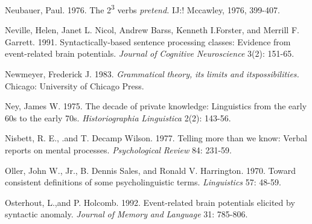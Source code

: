 \begin{styleStandard}
Neubauer, Paul. 1976. The 2\textsuperscript{3}\textsuperscript{ }verbs \textit{pretend.}\textit{ }IJ:! Mccawley, 1976, 399-407.
\end{styleStandard}


\begin{styleStandard}
Neville, Helen, Janet L. Nicol, Andrew Barss, Kenneth I.Forster, and Merrill F. Garrett. 1991. Syntactically-based sentence processing classes: Evidence from event-related brain potentials. \textit{Journal}\textit{ }\textit{of}\textit{ }\textit{Cognitive}\textit{ }\textit{Neuroscience}\textit{ }3(2): 151-65.
\end{styleStandard}


\begin{styleStandard}
Newmeyer, Frederick J. 1983. \textit{Grammatical}\textit{ }\textit{theory,}\textit{ }\textit{its}\textit{ }\textit{limits}\textit{ }\textit{and}\textit{ }\textit{itspossibilities.}\textit{ }Chicago: University of Chicago Press.
\end{styleStandard}


\begin{styleStandard}
Ney, James W. 1975. The decade of private knowledge: Linguistics from the early 60{\textquotesingle}s to the early 70{\textquotesingle}s. \textit{Historiographia}\textit{ }\textit{Linguistica}\textit{ }2(2): 143-56.
\end{styleStandard}


\begin{styleStandard}
Nisbett, R. E., .and T. Decamp Wilson. 1977. Telling more than we know: Verbal reports on mental processes. \textit{Psychological}\textit{ }\textit{Review}\textit{ }84: 231-59.
\end{styleStandard}


\begin{styleStandard}
Oller, John W., Jr., B. Dennis Sales, and Ronald V. Harrington. 1970. Toward consistent definitions of some psycholinguistic terms. \textit{Linguistics}\textit{ }57: 48-59.
\end{styleStandard}


\begin{styleStandard}
Osterhout, L.,and P. Holcomb. 1992. Event-related brain potentials elicited by syntactic anomaly. \textit{Journal}\textit{ }\textit{of}\textit{ }\textit{Memory}\textit{ }\textit{and}\textit{ }\textit{Language}\textit{ }31: 785-806.
\end{styleStandard}


